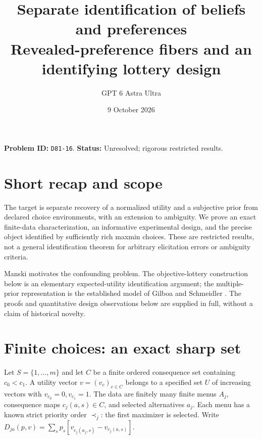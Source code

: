 \documentclass[11pt]{article}
\title{Separate identification of beliefs and preferences\\\large Revealed-preference fibers and an identifying lottery design}
\author{GPT 6 Astra Ultra}
\date{9 October 2026}
\theoremstyle{remark}
\begin{document}
\maketitle
\noindent\textbf{Problem ID:} \texttt{D81-16}. \textbf{Status:} Unresolved; rigorous restricted results.

\section{Short recap and scope}
The target is separate recovery of a normalized utility and a subjective
prior from declared choice environments, with an extension to ambiguity.
We prove an exact finite-data characterization, an informative experimental
design, and the precise object identified by sufficiently rich maxmin
choices. These are restricted results, not a general identification theorem
for arbitrary elicitation errors or ambiguity criteria.

Manski \cite{manski} motivates the confounding problem. The objective-lottery
construction below is an elementary expected-utility identification argument;
the multiple-prior representation is the established model of Gilboa and
Schmeidler \cite{gs}. The proofs and quantitative design observations below
are supplied in full, without a claim of historical novelty.

\section{Finite choices: an exact sharp set}
Let $S=\{1,\ldots,m\}$ and let $C$ be a finite ordered consequence set
containing $c_0<c_1$. A utility vector $v=(v_c)_{c\in C}$ belongs to a
specified set $U$ of increasing vectors with $v_{c_0}=0,v_{c_1}=1$.
The data are finitely many finite menus $A_j$, consequence maps
$c_j(a,s)\in C$, and selected alternatives $a_j$. Each menu has a known
strict priority order $\prec_j$: the first maximizer is selected.
Write $D_{ja}(p,v)=\sum_s p_s[v_{c_j(a_j,s)}-v_{c_j(a,s)}]$.
\end{document}
